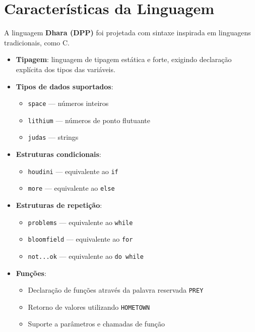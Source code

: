 \documentclass[a4paper,12pt]{article}
\begin{document}

\section{Características da Linguagem}

A linguagem \textbf{Dhara (DPP)} foi projetada com sintaxe inspirada em linguagens tradicionais, como C.

\begin{itemize}
    \item \textbf{Tipagem}: linguagem de tipagem estática e forte, exigindo declaração explícita dos tipos das variáveis.
    
    \item \textbf{Tipos de dados suportados}:
    \begin{itemize}
        \item \texttt{space} --- números inteiros
        \item \texttt{lithium} --- números de ponto flutuante
        \item \texttt{judas} --- strings
    \end{itemize}

    \item \textbf{Estruturas condicionais}:
    \begin{itemize}
        \item \texttt{houdini} --- equivalente ao \texttt{if}
        \item \texttt{more} --- equivalente ao \texttt{else}
    \end{itemize}

    \item \textbf{Estruturas de repetição}:
    \begin{itemize}
        \item \texttt{problems} --- equivalente ao \texttt{while}
        \item \texttt{bloomfield} --- equivalente ao \texttt{for}
        \item \texttt{not...ok} --- equivalente ao \texttt{do while}
    \end{itemize}

    \item \textbf{Funções}:
    \begin{itemize}
        \item Declaração de funções através da palavra reservada \texttt{PREY}
        \item Retorno de valores utilizando \texttt{HOMETOWN}
        \item Suporte a parâmetros e chamadas de função
    \end{itemize}


\end{itemize}
\end{document}
